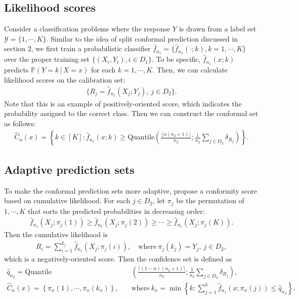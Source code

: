 \documentclass{article}
\numberwithin{equation}{section}
\begin{document}
\subsection{Likelihood scores}
Consider a classification problems where the response $Y$ is drawn from a label set $\mathcal{Y}=\{1,\cdots,K\}.$ Similar to the idea of split conformal prediction discussed in section 2, we first train a probabilistic classifier $\widehat{f}_{n_1} = \{\widehat{f}_{n_1}(\cdot;k),k=1,\cdots,K\}$ over the proper training set $\{(X_i,Y_i),i\in D_1\}$. To be specific, $\widehat{f}_{n_1}(x;k)$ predicts $\mathbb{P}(Y=k\,|\,X=x)$ for each $k=1,\cdots,K.$ Then, we can calculate likelihood scores on the calibration set:
\begin{align*}
	\{R_j=\widehat{f}_{n_1}(X_j;Y_j),\ j\in D_2\}.\tag{4.1}
\end{align*}
Note that this is an example of positively-oriented score, which indicates the probability assigned to the correct class. Then we can construct the conformal set as follows:
\begin{align*}
	\widehat{C}_n(x) = \left\{k\in[K]:\widehat{f}_{n_1}(x;k)\geq\mathrm{Quantile}\left(\frac{\lfloor\alpha(n_2+1)\rfloor}{n_2};\frac{1}{n_2}\sum_{j\in D_2}\delta_{R_j}\right)\right\}.\tag{4.2}
\end{align*}

\subsection{Adaptive prediction sets}
To make the conformal prediction sets more adaptive, \citet{RSC} propose a conformity score based on cumulative likelihood. For each $j\in D_2$, let $\pi_j$ be the permutation of $1,\cdots,K$ that sorts the predicted probabilities in decreasing order:
\begin{align*}
	\widehat{f}_{n_1}(X_j;\pi_j(1)) \geq \widehat{f}_{n_1}(X_j;\pi_j(2)) \geq \cdots \geq \widehat{f}_{n_1}(X_j;\pi_j(K)).\tag{4.3}
\end{align*}
Then the cumulative likelihood is
\begin{align*}
	R_i = \sum_{i=1}^{k_j}\widehat{f}_{n_1}(X_j;\pi_j(i)),\quad\text{where}\ \pi_j(k_j) = Y_j,\ j\in D_2,\tag{4.4}
\end{align*}
which is a negatively-oriented score. Then the confidence set is defined as
\begin{align*}
	\widehat{q}_{n_2} = \mathrm{Quantile}&\left(\frac{\lceil(1-\alpha)(n_2+1)\rceil }{n_2};\frac{1}{n_2}\sum_{j\in D_2}\delta_{R_j}\right),\tag{4.5}\\
	\widehat{C}_n(x) = \left\{\pi_x(1),\cdots,\pi_x(k_x)\right\},\quad&\text{where}\ k_x = \min\left\{k:\sum_{j=1}^{k}\widehat{f}_{n_1}(x;\pi_x(j))\leq \widehat{q}_{n_2}\right\}.\tag{4.6}
\end{align*}
\end{document}
